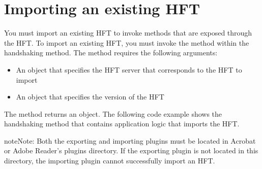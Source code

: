 \documentclass[letterpaper,12pt,english,openany,oneside]{sphinxmanual}
\begin{document}
\section{Importing an existing HFT}
\label{\detokenize{Plugins_Hft:importing-an-existing-hft}}
You must import an existing HFT to invoke methods that are exposed through the HFT. To import an existing HFT, you must invoke the  method within the  handshaking method. The  method requires the following arguments:
\begin{itemize}
\item {} 
An  object that specifies the HFT server that corresponds to the HFT to import

\item {} 
An  object that specifies the version of the HFT

\end{itemize}

The  method returns an  object. The following code example shows the  handshaking method that contains application logic that imports the  HFT.

\begin{sphinxVerbatim}[commandchars=\\\{\}]
   
     
     
\end{sphinxVerbatim}

\begin{sphinxadmonition}{note}{Note:}
Both the exporting and importing plugins must be located in Acrobat or Adobe Reader’s plugins directory. If the exporting plugin is not located in this directory, the importing plugin cannot successfully import an HFT.
\end{sphinxadmonition}
\end{document}
